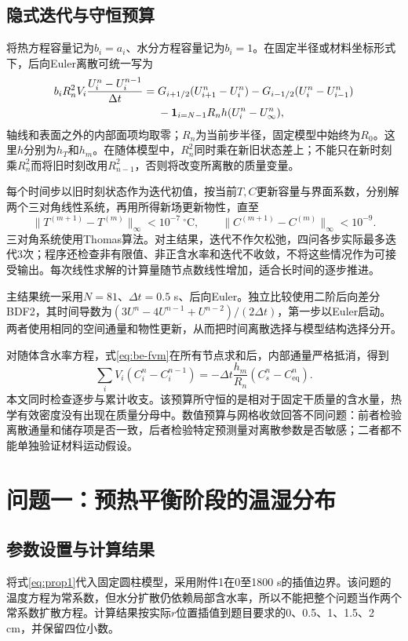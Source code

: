 \subsection{隐式迭代与守恒预算}
将热方程容量记为$b_i=a_i$、水分方程容量记为$b_i=1$。在固定半径或材料坐标形式下，后向Euler离散可统一写为
\begin{align}
 b_iR_n^2V_i\frac{U_i^n-U_i^{n-1}}{\Delta t}
 ={}&G_{i+1/2}(U_{i+1}^n-U_i^n)
   -G_{i-1/2}(U_i^n-U_{i-1}^n)\notag\\
 &-\boldsymbol1_{i=N-1}R_nh(U_i^n-U_\infty^n),
 \label{eq:be-fvm}
\end{align}
轴线和表面之外的内部面项均取零；$R_n$为当前步半径，固定模型中始终为$R_0$。这里$h$分别为$h_T$和$h_m$。在随体模型中，$R_n^2$同时乘在新旧状态差上；不能只在新时刻乘$R_n^2$而将旧时刻改用$R_{n-1}^2$，否则将改变所离散的质量变量。

每个时间步以旧时刻状态作为迭代初值，按当前$T,C$更新容量与界面系数，分别解两个三对角线性系统，再用所得新场更新物性，直至
\begin{equation}
 \|T^{(m+1)}-T^{(m)}\|_\infty<10^{-7}\ ^\circ\mathrm C,
 \qquad \|C^{(m+1)}-C^{(m)}\|_\infty<10^{-9}.
 \label{eq:picard}
\end{equation}
三对角系统使用Thomas算法。对主结果，迭代不作欠松弛，四问各步实际最多迭代3次；程序还检查非有限值、非正含水率和迭代不收敛，不将这些情况作为可接受输出。每次线性求解的计算量随节点数线性增加，适合长时间的逐步推进。

主结果统一采用$N=81$、$\Delta t=0.5$ s、后向Euler。独立比较使用二阶后向差分BDF2，其时间导数为$(3U^n-4U^{n-1}+U^{n-2})/(2\Delta t)$，第一步以Euler启动。两者使用相同的空间通量和物性更新，从而把时间离散选择与模型结构选择分开。

对随体含水率方程，式\eqref{eq:be-fvm}在所有节点求和后，内部通量严格抵消，得到
\begin{equation}
 \sum_iV_i(C_i^n-C_i^{n-1})
 =-\Delta t\frac{h_m}{R_n}(C_s^n-C_{\mathrm{eq}}^n).
 \label{eq:discrete-budget}
\end{equation}
本文同时检查逐步与累计收支。该预算所守恒的是相对于固定干质量的含水量，热学有效密度没有出现在质量分母中。数值预算与网格收敛回答不同问题：前者检验离散通量和储存项是否一致，后者检验特定预测量对离散参数是否敏感；二者都不能单独验证材料运动假设。

\section{问题一：预热平衡阶段的温湿分布}
\subsection{参数设置与计算结果}
将式\eqref{eq:prop1}代入固定圆柱模型，采用附件1在0至1800 s的插值边界。该问题的温度方程为常系数，但水分扩散仍依赖局部含水率，所以不能把整个问题当作两个常系数扩散方程。计算结果按实际$r$位置插值到题目要求的0、0.5、1、1.5、2 cm，并保留四位小数。

